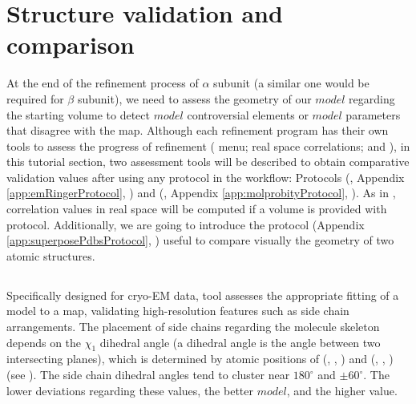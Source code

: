 \section{Structure validation and comparison}
\label{seq:structurevalidation}
 At the end of the refinement process of  $\alpha$ subunit (a similar one would be required for $\beta$ subunit), we need to assess the geometry of our $model$ regarding the starting 
volume to detect $model$ controversial elements or $model$ parameters that disagree with the map. Although each refinement program has their own tools to assess the progress of refinement (\coot {} menu; \phenix {} real space correlations;  {} and ), in this tutorial section, two assessment tools will be described to obtain comparative validation values after using any protocol in the workflow:  Protocols \emringer (, Appendix \ref{app:emRingerProtocol}, \citep{barad2015}) and \molprobity (, Appendix \ref{app:molprobityProtocol}, \citep{davis2004}). As in \phenix, correlation values in real space will be computed if a volume is provided with \molprobity protocol. Additionally, we are going to introduce the protocol  (Appendix \ref{app:superposePdbsProtocol}, \citep{zwartUrl}) useful to compare visually the geometry of two atomic structures.\\


 \subsection*{\emringer}
 
 Specifically designed for cryo-EM data, \emringer tool assesses the appropriate fitting of a model to a map, validating high-resolution features such as side chain arrangements. The placement of side chains regarding the molecule skeleton depends on the $\chi_{1}$ dihedral angle (a dihedral angle is the angle between two intersecting planes), which is determined by atomic positions of (, , ) and (, , ) (see ). The side chain dihedral angles tend to cluster near $180^\circ$ and $\pm60^\circ$. The lower deviations regarding these values, the better $model$, and the higher \emringer value.  

